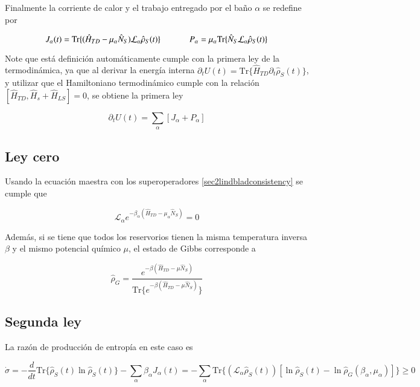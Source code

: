 Finalmente la corriente de calor y el trabajo entregado por el baño $\alpha$ se redefine por

\begin{equation*}
    J_{\alpha}(t) = \text{Tr}\{(\hat{H}_{TD} - \mu_{\alpha}\hat{N}_S)\mathcal{L}_{\alpha}\hat{\rho}_{S}(t) \} \hspace{12mm} P_{\alpha} = \mu_{\alpha} \text{Tr}\{\hat{N}_{S}\mathcal{L}_{\alpha}\hat{\rho}_{S}(t) \} 
\end{equation*}

Note que está definición automáticamente cumple con la primera ley de la termodinámica, ya que al derivar la energía interna $\partial_{t}U(t) = \text{Tr}\{ \hat{H}_{TD}\partial_{t}\hat{\rho}_{S}(t) \}$, y utilizar que el Hamiltoniano termodinámico cumple con la relación $[\hat{H}_{TD},\hat{H}_{s} + \hat{H}_{LS}] = 0$, se obtiene la primera ley

\begin{equation*}
    \partial_{t}U(t) = \sum_{\alpha}[J_{\alpha} + P_{\alpha}]
\end{equation*}

\subsection{Ley cero}
Usando la ecuación maestra con los superoperadores \ref{sec2lindbladconsistency} se cumple que

\begin{equation}
    \mathcal{L}_{\alpha}e^{-\beta_{\alpha}(\hat{H}_{TD} - \mu_{\alpha}\hat{N}_{S})} = 0
\label{sec2cerolaw}
\end{equation}

Además, si se tiene que todos los reservorios tienen la misma temperatura inversa $\beta$ y el mismo potencial químico $\mu$, el estado de Gibbs corresponde a 

\begin{equation*}
    \hat{\rho}_G = \frac{e^{-\beta(\hat{H}_{TD} - \mu \hat{N}_{S})}}{\text{Tr}\{ e^{-\beta(\hat{H}_{TD} - \mu \hat{N}_{S})}\}}
\end{equation*}

\subsection{Segunda ley}
La razón de producción de entropía en este caso es 

\begin{equation}
    \dot{\sigma} = - \frac{d}{dt}\text{Tr}\{\hat{\rho}_{S}(t) \ln \hat{\rho}_{S}(t) \} - \sum_{\alpha} \beta_{\alpha} J_{\alpha}(t) = -\sum_{\alpha} \text{Tr}\{(\mathcal{L}_{\alpha}\hat{\rho}_{S}(t))[\ln \hat{\rho}_{S}(t) - \ln \hat{\rho}_{G}(\beta_{\alpha},\mu_{\alpha})] \} \geq 0
\label{sec2secondlaw}
\end{equation}


